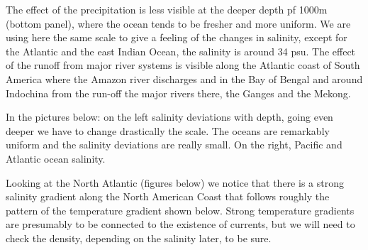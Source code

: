 The effect of the precipitation is less visible at the deeper depth pf
1000m (bottom panel), where the ocean tends to be fresher and more
uniform. We are using here the same scale to give a feeling of the
changes in salinity, except for the Atlantic and the east Indian Ocean,
the salinity is around 34 psu. 
The effect of the runoff from major river systems is visible along the
Atlantic coast of South America where the Amazon river discharges and in the Bay of Bengal and around Indochina from the run-off the major rivers there, the Ganges and the Mekong.


In the pictures below: on the left salinity deviations with depth, going even deeper we have to change drastically
the scale. The oceans are remarkably uniform and the salinity deviations are really small. On the right, Pacific and Atlantic ocean salinity.



Looking at the North Atlantic (figures below) we notice that
there is a strong salinity gradient along the North American Coast that
follows roughly the pattern of the temperature gradient shown below. Strong temperature gradients are presumably to be
connected to the existence of currents, but we will need to check the
density, depending on the salinity later, to be sure. 

